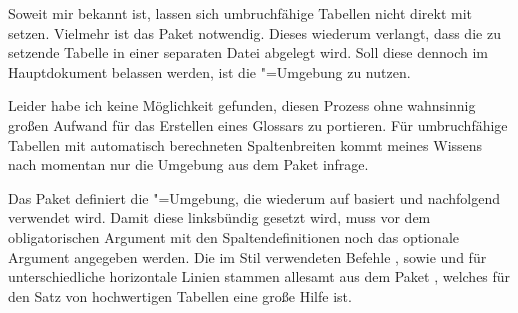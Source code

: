 \documentclass[%
  english,ngerman,%
  cdgeometry=no,DIV=12,automark,%
]{tudscrartcl}
\begin{document}
Soweit mir bekannt ist, lassen sich umbruchfähige Tabellen nicht direkt mit 
 setzen. Vielmehr ist das Paket  
notwendig. Dieses wiederum verlangt, dass die zu setzende Tabelle in einer 
separaten Datei abgelegt wird. Soll diese dennoch im Hauptdokument belassen 
werden, ist die "=Umgebung zu nutzen.

Leider habe ich keine Möglichkeit gefunden, diesen Prozess ohne wahnsinnig 
großen Aufwand für das Erstellen eines Glossars zu portieren. Für umbruchfähige 
Tabellen mit automatisch berechneten Spaltenbreiten kommt meines Wissens nach 
momentan nur die Umgebung  aus dem Paket  
infrage.

Das Paket  definiert die "=Umgebung, die 
wiederum auf  basiert und nachfolgend verwendet wird. 
Damit diese linksbündig gesetzt wird, muss vor dem obligatorischen Argument mit 
den Spaltendefinitionen noch das optionale Argument  angegeben 
werden. Die im Stil verwendeten Befehle ,  sowie
 und  für unterschiedliche horizontale Linien 
stammen allesamt aus dem Paket , welches für den Satz von 
hochwertigen Tabellen eine große Hilfe ist.
\end{document}
